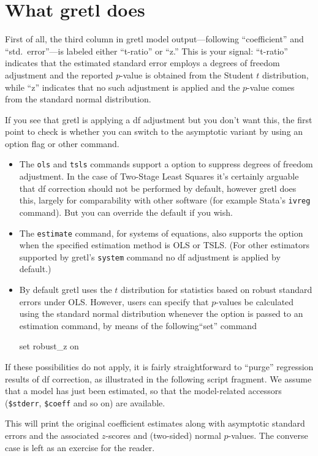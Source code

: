 \section{What gretl does}
\label{sec:df-policy}

First of all, the third column in gretl model output---following
``coefficient'' and ``std.\ error''---is labeled either ``t-ratio'' or
``z.'' This is your signal: ``t-ratio'' indicates that the estimated
standard error employs a degrees of freedom adjustment and the
reported $p$-value is obtained from the Student $t$ distribution,
while ``z'' indicates that no such adjustment is applied and the
$p$-value comes from the standard normal distribution.

If you see that gretl is applying a df adjustment but you don't want
this, the first point to check is whether you can switch to the
asymptotic variant by using an option flag or other command.
\begin{itemize}
\item The \texttt{ols} and \texttt{tsls} commands support a
   option to suppress degrees of freedom
  adjustment. In the case of Two-Stage Least Squares it's certainly
  arguable that df correction should not be performed by default,
  however gretl does this, largely for comparability with other
  software (for example \textsf{Stata}'s \texttt{ivreg} command).  But
  you can override the default if you wish.
\item The \texttt{estimate} command, for systems of equations, also
  supports the  option when the specified
  estimation method is OLS or TSLS. (For other estimators supported by
  gretl's \texttt{system} command no df adjustment is applied by
  default.)
\item By default gretl uses the $t$ distribution for statistics based
  on robust standard errors under OLS. However, users can specify that
  $p$-values be calculated using the standard normal distribution
  whenever the  option is passed to an estimation
  command, by means of the following``set'' command
%
\begin{code}
set robust_z on
\end{code}
\end{itemize}

If these possibilities do not apply, it is fairly straightforward to
``purge'' regression results of df correction, as illustrated in the
following script fragment. We assume that a model has just been
estimated, so that the model-related accessors
(\verb|$stderr|, \verb|$coeff| and so on) are available.
%

This will print the original coefficient estimates along with
asymptotic standard errors and the associated
$z$-scores and (two-sided) normal $p$-values. The converse case is
left as an exercise for the reader.


